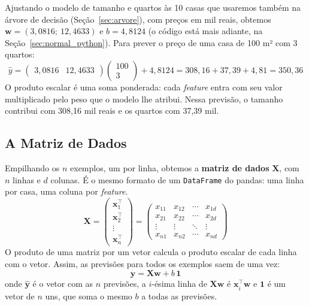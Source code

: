 \documentclass[a4paper,12pt,openany]{book}
\begin{document}
Ajustando o modelo de tamanho e quartos às 10 casas que usaremos também na árvore de decisão (Seção~\ref{sec:arvore}), com preços em mil reais, obtemos \(\mathbf{w} = (3,0816;\ 12,4633)\) e \(b = 4,8124\) (o código está mais adiante, na Seção~\ref{sec:normal_python}). Para prever o preço de uma casa de 100 m² com 3 quartos:
\[
\hat{y} = \begin{pmatrix} 3,0816 & 12,4633 \end{pmatrix} \begin{pmatrix} 100 \\ 3 \end{pmatrix} + 4,8124 = 308,16 + 37,39 + 4,81 = 350,36
\]
O produto escalar é uma soma ponderada: cada \textit{feature} entra com seu valor multiplicado pelo peso que o modelo lhe atribui. Nessa previsão, o tamanho contribui com 308,16 mil reais e os quartos com 37,39 mil.

\subsection{A Matriz de Dados}

Empilhando os \(n\) exemplos, um por linha, obtemos a \textbf{matriz de dados} \(\mathbf{X}\), com \(n\) linhas e \(d\) colunas. É o mesmo formato de um \texttt{DataFrame} do pandas: uma linha por casa, uma coluna por \textit{feature}.
\[
\mathbf{X} = \begin{pmatrix} \mathbf{x}_1^\top \\ \mathbf{x}_2^\top \\ \vdots \\ \mathbf{x}_n^\top \end{pmatrix}
= \begin{pmatrix}
x_{11} & x_{12} & \cdots & x_{1d} \\
x_{21} & x_{22} & \cdots & x_{2d} \\
\vdots & \vdots & \ddots & \vdots \\
x_{n1} & x_{n2} & \cdots & x_{nd}
\end{pmatrix}
\]
O produto de uma matriz por um vetor calcula o produto escalar de cada linha com o vetor. Assim, as previsões para todos os exemplos saem de uma vez:
\begin{equation}
\hat{\mathbf{y}} = \mathbf{X}\mathbf{w} + b\,\mathbf{1}
\end{equation}
onde \(\hat{\mathbf{y}}\) é o vetor com as \(n\) previsões, a \(i\)-ésima linha de \(\mathbf{X}\mathbf{w}\) é \(\mathbf{x}_i^\top \mathbf{w}\) e \(\mathbf{1}\) é um vetor de \(n\) uns, que soma o mesmo \(b\) a todas as previsões.
\end{document}
